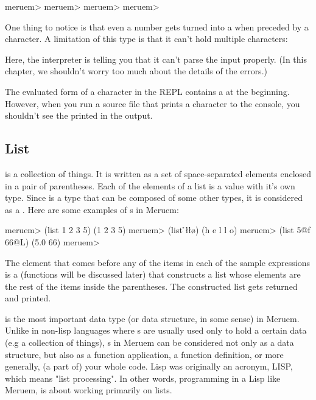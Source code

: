 \begin{REPL}
meruem> \a
\a
meruem> \6 
\6
meruem> \?
\?
meruem> 
\end{REPL}

One thing to notice is that even a number gets turned into a  when preceded by a \code{\textbackslash} character. A limitation of this type is that it can't hold multiple characters:

\begin{REPL}
meruem> \hello
An error has occurred. Parse Failure: string matching regex `\z' expected but `e' found
Source: .home.melvic.meruem.meruem.prelude [11:53}]
(defun truthy? (expr) (and (!= expr false) (!= expr nil)))

\end{REPL}

Here, the interpreter is telling you that it can't parse the input properly. (In this chapter, we shouldn't worry too much about the details of the errors.)

\begin{noteparagraph}
The evaluated form of a character in the REPL contains a \code{\textbackslash} at the beginning. However, when you run a source file that prints a character to the console, you shouldn't see the \code{\textbackslash} printed in the output.
\end{noteparagraph}

\subsection{List}
 is a collection of things. It is written as a set of space-separated elements enclosed in a pair of parentheses. Each of the elements of a list is a value with it's own type. Since  is a type that can be composed of some other types, it is considered as a . Here are some examples of s in Meruem:

\begin{REPL}
meruem> (list 1 2 3 5)
(1 2 3 5)
meruem> (list \h \e \l \l \o)
(h e l l o)
meruem> (list 5@f 66@L)
(5.0 66)
meruem> 
\end{REPL}


The  element that comes before any of the items in each of the sample expressions is a  (functions will be discussed later) that constructs a list whose elements are the rest of the items inside the parentheses. The constructed list gets returned and printed.

 is the most important data type (or data structure, in some sense) in Meruem. Unlike in non-lisp languages where s are usually used only to hold a certain data (e.g a collection of things), s in Meruem can be considered not only as a data structure, but also as a function application, a function definition, or more generally, (a part of) your whole code. Lisp was originally an acronym, LISP, which means "list processing". In other words, programming in a Lisp like Meruem, is about working primarily on lists. 


